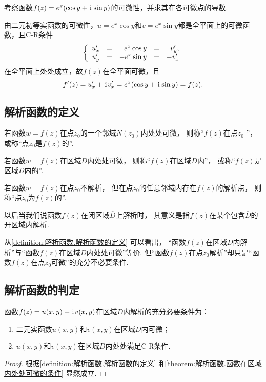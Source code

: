 \begin{example}
考察函数\(f(z) = e^x (\cos y + \kern1pt\mathrm{i}\kern1pt \sin y)\)的可微性，并求其在各可微点的导数.
\begin{solution}
由二元初等实函数的可微性，\(u = e^x \cos y\)和\(v = e^x \sin y\)都是全平面上的可微函数，且C-R条件\[
\left\{ \begin{array}{*5r}
u'_x &=& e^x \cos y &=& v'_y, \\
u'_y &=& - e^x \sin y &=& - v'_x
\end{array} \right.
\]在全平面上处处成立，故\(f(z)\)在全平面可微，且\[
f'(z) = u'_x + \kern1pt\mathrm{i}\kern1pt v'_x = e^x (\cos y + \kern1pt\mathrm{i}\kern1pt \sin y) = f(z).
\]
\end{solution}
\end{example}

\subsection{解析函数的定义}
\begin{definition}\label{definition:解析函数.解析函数的定义}
若函数\(w=f(z)\)在点\(z_0\)的一个邻域\(N(z_0)\)内处处可微，
则称“\(f(z)\)在点\(z_0\) ”，
或称“点\(z_0\)是\(f(z)\)的”.

若函数\(w=f(z)\)在区域\(D\)内处处可微，
则称“\(f(z)\)在区域\(D\)内”，
或称“\(f(z)\)是区域\(D\)内的”.

若函数\(w=f(z)\)在点\(z_0\)不解析，
但在点\(z_0\)的任意邻域内存在\(f(z)\)的解析点，
则称“点\(z_0\)为\(f(z)\)的”.
\end{definition}
以后当我们说函数\(f(z)\)在闭区域\(\overline{D}\)上解析时，
其意义是指\(f(z)\)在某个包含\(\overline{D}\)的开区域内解析.

从\cref{definition:解析函数.解析函数的定义} 可以看出，
“函数\(f(z)\)在区域\(D\)内解析”与“函数\(f(z)\)在区域\(D\)内处处可微”等价.
但“函数\(f(z)\)在点\(z_0\)解析”却只是“函数\(f(z)\)在点\(z_0\)可微”的充分不必要条件.

\subsection{解析函数的判定}
\begin{theorem}\label{theorem:解析函数.函数在区域内处处解析的充分必要条件}
函数\(f(z)=u(x,y)+\kern1pt\mathrm{i}\kern1pt v(x,y)\)在区域\(D\)内解析的充分必要条件为：
\begin{enumerate}
\item 二元实函数\(u(x,y)\)和\(v(x,y)\)在区域\(D\)内可微；
\item \(u(x,y)\)和\(v(x,y)\)在区域\(D\)内处处满足C-R条件.
\end{enumerate}
\begin{proof}
根据\cref{definition:解析函数.解析函数的定义} 和\cref{theorem:解析函数.函数在区域内处处可微的条件} 显然成立.
\end{proof}
\end{theorem}

